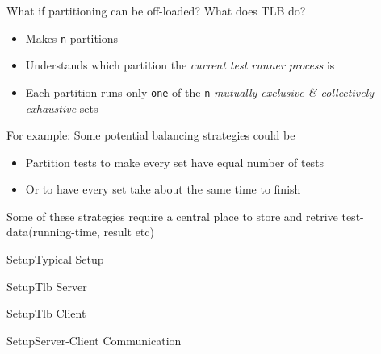 \documentclass{beamer}
\begin{document}
\begin{frame}{What if partitioning can be off-loaded?}
  What does TLB do?
  \begin{itemize}
  \item Makes \texttt{n} partitions
    \pause
  \item Understands which partition the \emph{current test runner process} is
    \pause
  \item Each partition runs only \texttt{one} of the \texttt{n} \emph{mutually exclusive \& collectively exhaustive} sets
  \end{itemize}
\end{frame}

\begin{frame}{For example:}
  Some potential balancing strategies could be
  \pause
  \begin{itemize}
    \item Partition tests to make every set have equal number of tests
      \pause
    \item Or to have every set take about the same time to finish
  \end{itemize}
  \pause
  Some of these strategies require a central place to store and retrive test-data(running-time, result etc)
\end{frame}

\begin{frame}{Setup}{Typical Setup}
  \begin{centering}
  \end{centering}
\end{frame}

\begin{frame}{Setup}{Tlb Server}
  \begin{centering}
  \end{centering}
\end{frame}

\begin{frame}{Setup}{Tlb Client}
  \begin{centering}
  \end{centering}
\end{frame}

\begin{frame}{Setup}{Server-Client Communication}
  \begin{centering}
  \end{centering}
\end{frame}
\end{document}
